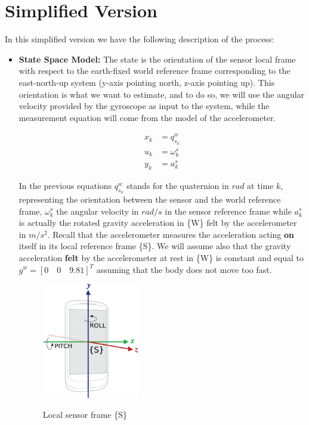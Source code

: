 \documentclass[a4paper,10pt]{article}
\begin{document}
\section{Simplified Version}
In this simplified version we have the following description of the process:
\begin{itemize}
 \item \textbf{State Space Model:} The state is the orientation of the sensor local frame  with respect to the earth-fixed world reference frame  corresponding to the east-north-up system (y-axis pointing north, z-axis pointing up). This orientation is what we want to estimate, and to do so, we will use the angular velocity provided by the gyroscope as input to the system, while the measurement equation will come from the model of the accelerometer.

\begin{align}
 x_k &= q^w_{s_k} \\
 u_k &= \omega^s_k \\
 y_k &= a^s_{k}
\end{align}

In the previous equations $q^w_{s_k}$ stands for the quaternion in $rad$ at time $k$, representing the orientation between the sensor and the world reference frame, $\omega^s_k$ the angular velocity in $rad/s$ in the sensor reference frame while $a^s_{k}$ is actually the rotated gravity acceleration in \{W\} felt by the accelerometer in $m/s^2$. Recall that the accelerometer measures the acceleration acting \textbf{on} itself in its local reference frame \{S\}. We will assume also that the gravity acceleration \textbf{felt} by the accelerometer at rest in \{W\} is constant and equal to $g^w = [0 \quad 0 \quad 9.81]^T$ assuming that the body does not move too fast. 

\begin{figure}[h]
 \centering
 \includegraphics[width=0.4\textwidth]{./fig/axis_device.png}
 \label{fig:phone_frame}
 \caption{Local sensor frame \{S\}}
\end{figure}



\end{itemize}
\end{document}
